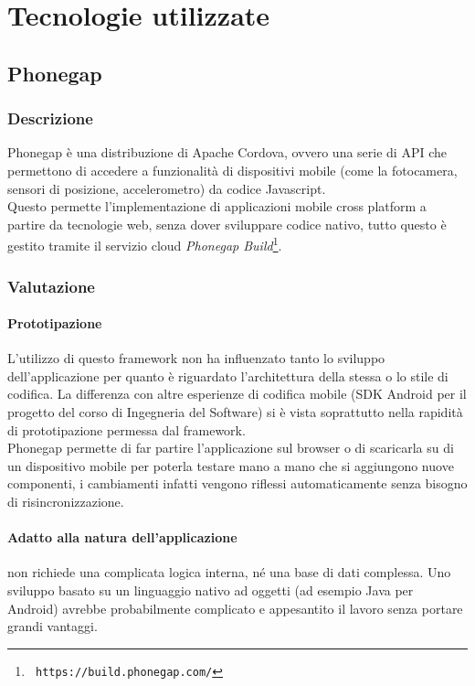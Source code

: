 \section{Tecnologie utilizzate}

\subsection{Phonegap}

\subsubsection{Descrizione}
Phonegap è una distribuzione di Apache Cordova, ovvero una serie di API che permettono
di accedere a funzionalità di dispositivi mobile (come la fotocamera, sensori di posizione,
accelerometro) da codice Javascript. \\

Questo permette l'implementazione di applicazioni mobile cross platform a partire da 
tecnologie web, senza dover sviluppare codice nativo, tutto questo è gestito tramite il
servizio cloud \textit{Phonegap Build}\footnote{\texttt{ https://build.phonegap.com/}}. \\

\subsubsection{Valutazione}

\paragraph{Prototipazione}
L'utilizzo di questo framework non ha influenzato tanto lo sviluppo dell'applicazione
per quanto è riguardato l'architettura della stessa o lo stile di codifica. La differenza
con altre esperienze di codifica mobile (SDK Android per il progetto del corso di Ingegneria
del Software) si è vista soprattutto nella rapidità di prototipazione permessa dal framework. \\
Phonegap permette di far partire l'applicazione sul browser o di scaricarla su di un
dispositivo mobile per poterla testare mano a mano che si aggiungono nuove componenti,
i cambiamenti infatti vengono riflessi automaticamente senza bisogno di risincronizzazione.

\paragraph{Adatto alla natura dell'applicazione}
\fiscoloMobile{} non richiede una complicata logica interna, né una base di dati complessa.
Uno sviluppo basato su un linguaggio nativo ad oggetti (ad esempio Java per Android) avrebbe
probabilmente complicato e appesantito il lavoro senza portare grandi vantaggi. \\

